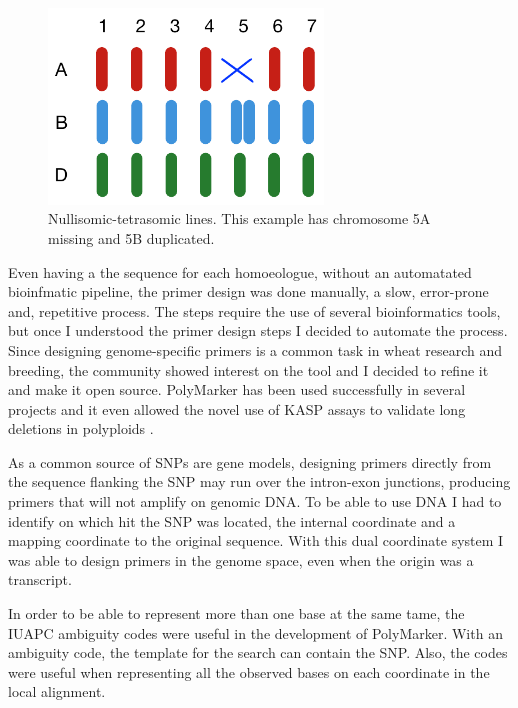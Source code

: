 \begin{figure}
\includegraphics[width=0.65\textwidth]{PolyMarker/Figures/disc/NulliTera.pdf}
\caption[Nullisomic-tetrasomic lines]{ Nullisomic-tetrasomic lines. This example has chromosome 5A missing and 5B duplicated. }
\label{fig:poly:nullitetra}
\end{figure}

Even having a the sequence for each homoeologue, without an automatated bioinfmatic pipeline, the primer design was done manually, a slow, error-prone and, repetitive process. 
The steps require the use of several bioinformatics tools, but once I understood the primer design steps I decided to automate the process. 
Since designing genome-specific primers is a common task in wheat research and breeding, the community showed interest on the tool and I decided to refine it and make it open source. 
PolyMarker has been used successfully in several projects \citep{Ramirez-Gonzalez2015b,Hubbard2015,Burt2015,King2015,Sollars2016} and it even allowed the novel use of KASP assays to validate long deletions in polyploids \citep{Krasileva2016}. 
 
As a common source of SNPs are gene models, designing primers directly from the sequence flanking the SNP may run over the intron-exon junctions, producing primers that will not amplify on genomic DNA. 
To be able to use DNA I had to identify on which hit the SNP was located, the internal coordinate and a mapping coordinate to the original sequence. 
With this dual coordinate system I was able to design primers in the genome space, even when the origin was a transcript. 

In order to be able to represent more than one base at the same tame, the IUAPC ambiguity codes \citep{Cornish-Bowden1985} were useful in the development of PolyMarker. 
With an ambiguity code, the template for the search can contain the SNP. 
Also, the codes were useful when representing all the observed bases on each coordinate in the local alignment. 

